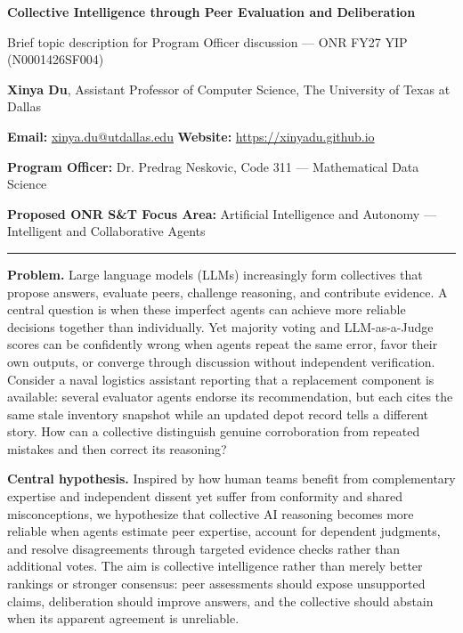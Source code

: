 \documentclass[10pt,letterpaper]{article}
\newcommand{\head}[1]{\textbf{#1}\enspace}
\newcommand{\POline}{Dr. Predrag Neskovic, Code 311 --- Mathematical Data Science}
\newcommand{\FocusArea}{Artificial Intelligence and Autonomy --- Intelligent and Collaborative Agents}
\begin{document}
\begin{center}
{\fontsize{14}{16}\selectfont\bfseries Collective Intelligence through Peer Evaluation and Deliberation\par}
\vspace{2pt}
{\small Brief topic description for Program Officer discussion --- ONR FY27 YIP (N0001426SF004)}
\end{center}
\vspace{-2pt}
{\small \textbf{Xinya Du}, Assistant Professor of Computer Science, The University of Texas at Dallas\par
\textbf{Email:} \href{mailto:xinya.du@utdallas.edu}{xinya.du@utdallas.edu} \quad \textbf{Website:} \href{https://xinyadu.github.io}{https://xinyadu.github.io}\par
\textbf{Program Officer:} \POline\par
\textbf{Proposed ONR S\&T Focus Area:} \FocusArea\par}
\vspace{2pt}\hrule\vspace{5pt}
\head{Problem.} Large language models (LLMs) increasingly form collectives that propose answers, evaluate peers, challenge reasoning, and contribute evidence. A central question is when these imperfect agents can achieve more reliable decisions together than individually. Yet majority voting and LLM-as-a-Judge scores can be confidently wrong when agents repeat the same error, favor their own outputs, or converge through discussion without independent verification. Consider a naval logistics assistant reporting that a replacement component is available: several evaluator agents endorse its recommendation, but each cites the same stale inventory snapshot while an updated depot record tells a different story. How can a collective distinguish genuine corroboration from repeated mistakes and then correct its reasoning?
\par\head{Central hypothesis.} Inspired by how human teams benefit from complementary expertise and independent dissent yet suffer from conformity and shared misconceptions, we hypothesize that collective AI reasoning becomes more reliable when agents estimate peer expertise, account for dependent judgments, and resolve disagreements through targeted evidence checks rather than additional votes. The aim is collective intelligence rather than merely better rankings or stronger consensus: peer assessments should expose unsupported claims, deliberation should improve answers, and the collective should abstain when its apparent agreement is unreliable.
\end{document}
